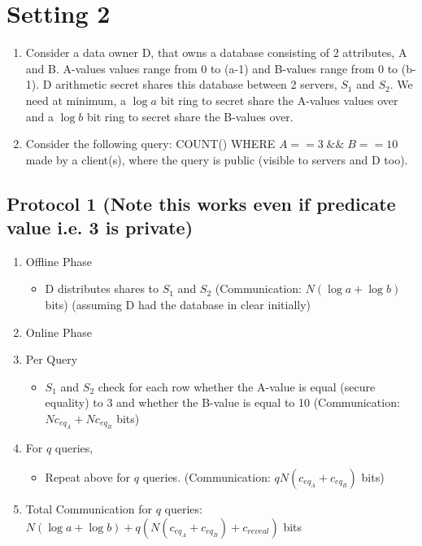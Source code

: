 \section{Setting 2}
\begin{enumerate}
    \item Consider a data owner D, that owns a database consisting of 2 attributes, A and B. A-values values range from 0 to (a-1) and B-values range from 0 to (b-1). D arithmetic secret shares this database between 2 servers, $S_1$ and $S_2$. We need at minimum, a $\log a$ bit ring to secret share the A-values values over and a $\log b$ bit ring to secret share the B-values over.
    \item Consider the following query: COUNT() WHERE $A == 3 \;\&\&\; B == 10$ made by a client(s), where the query is public (visible to servers and D too).
\end{enumerate}

\subsection{Protocol 1 (Note this works even if predicate value i.e. 3 is private)}
\begin{enumerate}
    \item Offline Phase
    \begin{itemize}
        \item D distributes shares to $S_1$ and $S_2$ (Communication: $N(\log a + \log b)$ bits) (assuming D had the database in clear initially)
    \end{itemize}
    \item Online Phase
    \item Per Query
    \begin{itemize}
        \item $S_1$ and $S_2$ check for each row whether the A-value is equal (secure equality) to 3 and whether the B-value is equal to 10 (Communication: $Nc_{eq_A} + Nc_{eq_B}$ bits)
    \end{itemize}
    \item For $q$ queries,
    \begin{itemize}
        \item Repeat above for $q$ queries. (Communication: $qN(c_{eq_A} + c_{eq_B})$ bits)
    \end{itemize}
    \item Total Communication for $q$ queries: $N(\log a + \log b) + q(N(c_{eq_A} + c_{eq_B}) + c_{reveal})$ bits
\end{enumerate}

